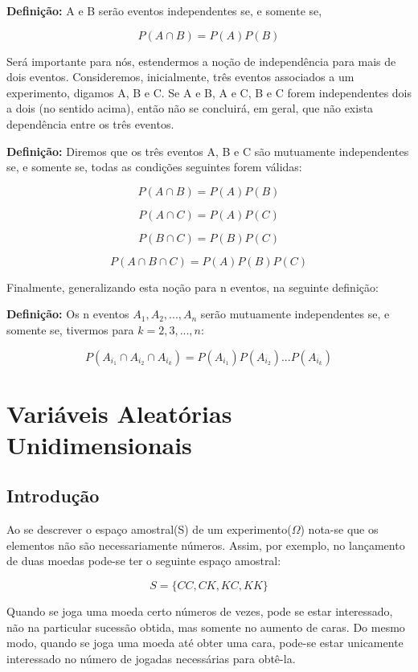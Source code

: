 \textbf{Definição:} A e B serão eventos independentes se, e
somente se,

$$
P(A \cap B) = P(A)P(B)
$$

Será importante para nós, estendermos a noção de independência
para mais de dois eventos. Consideremos, inicialmente, três
eventos associados a um experimento, digamos A, B e C. Se A e B, A
e C, B e C forem independentes dois a dois (no sentido acima),
então não se concluirá, em geral, que não exista dependência entre
os três eventos.\vskip0.3cm

\textbf{Definição:} Diremos que os três eventos A, B e C são
mutuamente independentes se, e somente se, todas as condições
seguintes forem válidas:

$$
P(A \cap B)=P(A)P(B)
$$

$$
P(A \cap C)=P(A)P(C)
$$

$$
P(B \cap C)=P(B)P(C)
$$

$$
P(A \cap B \cap C)=P(A)P(B)P(C)
$$


Finalmente, generalizando esta noção para n eventos, na seguinte
definição:\vskip0.3cm

\textbf{Definição:} Os n eventos $A_{1},A_{2},...,A_{n}$ serão
mutuamente independentes se, e somente se, tivermos para
$k=2,3,...,n$:

\begin{equation}\label{}
    P(A_{i_{1}} \cap A_{i_{2}} \cap A_{i_{k}})=
    P(A_{i_{1}})P(A_{i_{2}})...P(A_{i_{k}})
\end{equation}


\section{Variáveis Aleatórias Unidimensionais}
\subsection{Introdução}

Ao se descrever o espaço amostral(S) de um experimento($\Omega$)
nota-se que os elementos não são necessariamente números. Assim,
por exemplo, no lançamento de duas moedas pode-se ter o seguinte
espaço amostral:\vskip0.3cm


\begin{equation}
    S = \{CC, CK, KC, KK\}
\end{equation}


\par Quando se joga uma moeda certo números de vezes, pode se estar
interessado, não na particular sucessão obtida, mas somente no
aumento de caras. Do mesmo modo, quando se joga uma moeda até
obter uma cara, pode-se estar unicamente interessado no número de
jogadas necessárias para obtê-la.\vskip0.3cm


